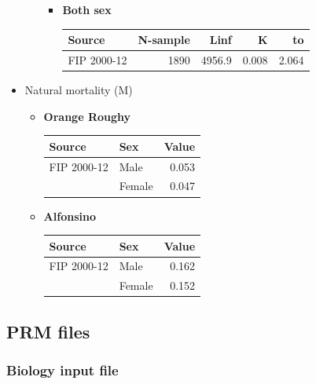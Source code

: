 \documentclass[11pt]{article}
\begin{document}
\begin{itemize}
\begin{itemize}
\begin{itemize}
\item \textbf{Both sex}

\begin{center}
\begin{tabular}{lrrrr}
 Source       &  N-sample  &    Linf  &      K  &     to  \\
\hline
 FIP 2000-12  &      1890  &  4956.9  &  0.008  &  2.064  \\
\end{tabular}
\end{center}


\end{itemize}
\end{itemize}


\item Natural mortality (M)
\label{sec-5-1-2-3-4}%
\begin{itemize}
\item \textbf{Orange Roughy}

\begin{center}
\begin{tabular}{llr}
 Source       &  Sex     &  Value  \\
\hline
 FIP 2000-12  &  Male    &  0.053  \\
              &  Female  &  0.047  \\
\end{tabular}
\end{center}


\item \textbf{Alfonsino}

\begin{center}
\begin{tabular}{llr}
 Source       &  Sex     &  Value  \\
\hline
 FIP 2000-12  &  Male    &  0.162  \\
              &  Female  &  0.152  \\
\end{tabular}
\end{center}


\end{itemize}

\end{itemize} %
\subsection*{PRM files}
\label{sec-5-2}
\subsubsection*{Biology input file}
\label{sec-5-2-1}
\end{document}
